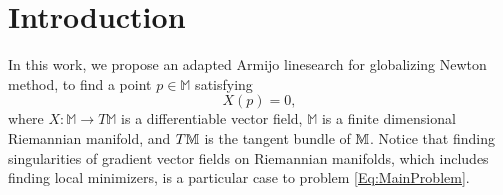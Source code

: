\section{Introduction}
\label{Introduction}
In this work, we propose an adapted Armijo linesearch for globalizing Newton method, to find a point $p\in\mathbb{M}$ satisfying
\begin{equation}\label{Eq:MainProblem}
X(p)=0,
\end{equation}
where $X:\mathbb{M}\to T\mathbb{M}$ is a differentiable vector field, $\mathbb{M}$ is a finite dimensional Riemannian manifold, and $T\mathbb{M}$ is  the tangent bundle of $\mathbb{M}$. Notice that finding singularities of gradient vector fields on Riemannian manifolds,  which includes finding local minimizers, is a particular case to problem \eqref{Eq:MainProblem}. 

